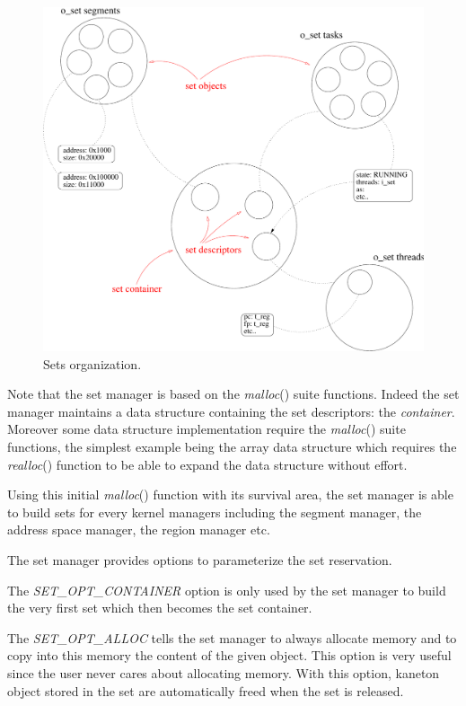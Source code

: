 \begin{figure}[h]
  \begin{center}
    \includegraphics[scale=0.5]{figures/core_sets.pdf}
    \caption{Sets organization.}
    \label{figure:core_sets}
  \end{center}
\end{figure}

Note that the set manager is based on the \textit{malloc}() suite functions.
Indeed the set manager maintains a data structure containing the set
descriptors: the \textit{container}. Moreover some data structure
implementation require the \textit{malloc}() suite functions, the simplest
example being the array data structure which requires the \textit{realloc}()
function to be able to expand the data structure without effort.

Using this initial \textit{malloc}() function with its survival area,
the set manager is able to build sets for every kernel managers including
the segment manager, the address space manager, the region manager etc.

The set manager provides options to parameterize the set reservation.

The \textit{SET\_OPT\_CONTAINER} option is only used by the set manager
to build the very first set which then becomes the set container.

The \textit{SET\_OPT\_ALLOC} tells the set manager to always allocate
memory and to copy into this memory the content of the given object.
This option is very useful since the user never cares about allocating
memory. With this option, kaneton object stored in the set are automatically
freed when the set is released.

